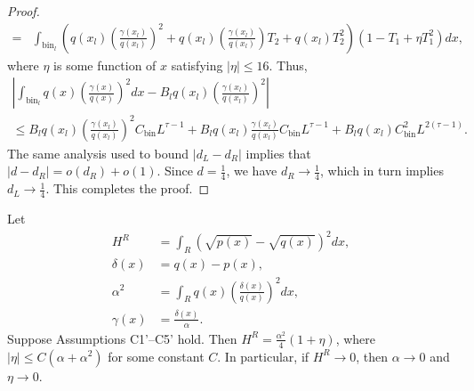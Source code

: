 \documentclass{article}
\newcommand{\bin}{\text{bin}}
\begin{document}
\begin{proof}
\begin{align*}
 =& \int_{\bin_l} \left( q(x_l) \left( \frac{\gamma(x_l)}{q(x_l)} \right)^2 + 
                q(x_l) \left( \frac{\gamma(x_l)}{q(x_l)} \right) T_2 + q(x_l) T_2^2 \right) 
    (1 - T_1 + \eta T_1^2) dx,
\end{align*}
where $\eta$ is some function of $x$ satisfying $|\eta| \leq 16$. Thus,
\begin{multline*}
\left| \int_{\bin_l} q(x) \left( \frac{\gamma(x)}{q(x)} \right)^2 dx - 
      B_l q(x_l) \left( \frac{\gamma(x_l)}{q(x_l)} \right)^2 \right| \\
%
\leq   B_l q(x_l) \left( \frac{\gamma(x_l)}{q(x_l)} \right)^2 C_\bin L^{\tau-1} +
      B_l q(x_l) \frac{\gamma(x_l)}{q(x_l)} C_\bin L^{\tau-1} + B_l q(x_l) C_\bin^2 L^{2(\tau-1)}. 
\end{multline*}
The same analysis used to bound $|d_L-d_R|$ implies that
$|d - d_R| = o(d_R) + o(1)$.
Since $d = \frac{1}{4}$, we have $d_R \to \frac{1}{4}$, which in turn implies $d_L \to \frac{1}{4}$. This completes the proof.
\end{proof}





\begin{lemma}
\label{prop:continuous_hellinger_chi_square}
Let
\begin{align*}
H^R & = \int_R (\sqrt{p(x)} - \sqrt{q(x)})^2 dx, \\
%
\delta(x) & = q(x) - p(x), \\
%
\alpha^2 & = \int_R q(x) \left( \frac{\delta(x)}{q(x)} \right)^2 dx, \\
%
\gamma(x) & = \frac{\delta(x)}{\alpha}.
\end{align*}
Suppose Assumptions C1'--C5' hold. Then $H^R = \frac{\alpha^2}{4}(1 + \eta)$,
where $|\eta| \leq C(\alpha + \alpha^2)$ for some constant $C$. In particular, if $H^R \rightarrow 0$, then $\alpha \rightarrow 0$ and $\eta \rightarrow 0$. 
\end{lemma}
\end{document}
